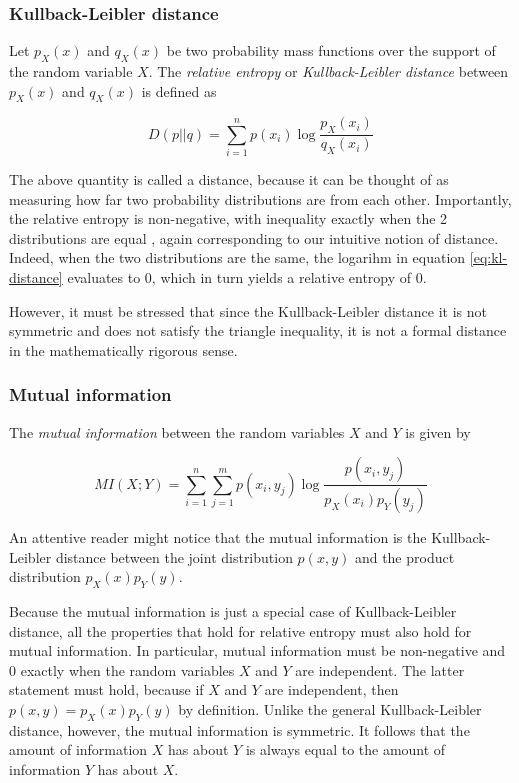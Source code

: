 \documentclass[12pt]{article}
\begin{document}
\subsubsection{Kullback-Leibler distance}

Let $p_X(x)$ and $q_X(x)$ be two probability mass functions over the support of the random variable $X$. The \textit{relative entropy} or \textit{Kullback-Leibler distance} \cite{cover-thomas} between $p_X(x)$ and $q_X(x)$ is defined as

\begin{equation}
D(p||q) = \sum_{i = 1}^n p(x_i) \log \frac{p_X(x_i)}{q_X(x_i)}
\label{eq:kl-distance}
\end{equation} 

The above quantity is called a distance, because it can be thought of as measuring how far two probability distributions are from each other. Importantly, the relative entropy is non-negative, with inequality exactly when the 2 distributions are equal \cite{cover-thomas}, again corresponding to our intuitive notion of distance. Indeed, when the two distributions are the same, the logarihm in equation \ref{eq:kl-distance} evaluates to 0, which in turn yields a relative entropy of 0. 

However, it must be stressed that since the Kullback-Leibler distance it is not symmetric and does not satisfy the triangle inequality, it is not a formal distance in the mathematically rigorous sense.

\subsubsection{Mutual information}

The \textit{mutual information} \cite{cover-thomas} between the random variables $X$ and $Y$ is given by 

\begin{equation}
MI(X;Y) = \sum_{i=1}^n \sum_{j=1}^m p(x_i,y_j) \log \frac{p(x_i,y_j)}{p_X(x_i)p_Y(y_j)}
\label{eq:mutual-inf}
\end{equation}

An attentive reader might notice that the mutual information is the Kullback-Leibler distance between the joint distribution $p(x,y)$ and the product distribution $p_X(x)p_Y(y)$.

Because the mutual information is just a special case of Kullback-Leibler distance, all the properties that hold for relative entropy must also hold for mutual information. In particular, mutual information must be non-negative and 0 exactly when the random variables $X$ and $Y$ are independent. The latter statement must hold, because if $X$ and $Y$ are independent, then $p(x,y) = p_X(x)p_Y(y)$ by definition. Unlike the general Kullback-Leibler distance, however, the mutual information is symmetric. It follows that the amount of information $X$ has about $Y$ is always equal to the amount of information $Y$ has about $X$. 
\end{document}
